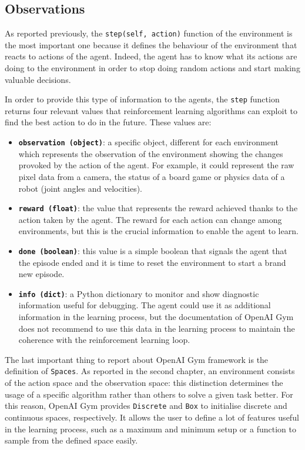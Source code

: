 \subsection{Observations} \label{ch3:observations}

As reported previously, the \texttt{step(self, action)} function of the environment is the most important one because it defines the behaviour of the environment that reacts to actions of the agent.
Indeed, the agent has to know what its actions are doing to the environment in order to stop doing random actions and start making valuable decisions.

In order to provide this type of information to the agents, the \texttt{step} function returns four relevant values that reinforcement learning algorithms can exploit to find the best action to do in the future. These values are:

\begin{itemize}
	\item \textbf{\texttt{observation (object)}}: a specific object, different for each environment which represents the observation of the environment showing the changes provoked by the action of the agent. For example, it could represent the raw pixel data from a camera, the status of a board game or physics data of a robot (joint angles and velocities).
	\item \textbf{\texttt{reward (float)}}: the value that represents the reward achieved thanks to the action taken by the agent. The reward for each action can change among environments, but this is the crucial information to enable the agent to learn.
	\item \textbf{\texttt{done (boolean)}}: this value is a simple boolean that signals the agent that the episode ended and it is time to reset the environment to start a brand new episode.
	\item \textbf{\texttt{info (dict)}}: a Python dictionary to monitor and show diagnostic information useful for debugging. The agent could use it as additional information in the learning process, but the documentation of OpenAI Gym does not recommend to use this data in the learning process to maintain the coherence with the reinforcement learning loop.
\end{itemize}

The last important thing to report about OpenAI Gym framework is the definition of \texttt{Spaces}. As reported in the second chapter, an environment consists of the action space and the observation space: this distinction determines the usage of a specific algorithm rather than others to solve a given task better. For this reason, OpenAI Gym provides \texttt{Discrete} and \texttt{Box} to initialise discrete and continuous spaces, respectively. It allows the user to define a lot of features useful in the learning process, such as a maximum and minimum setup or a function to sample from the defined space easily.

